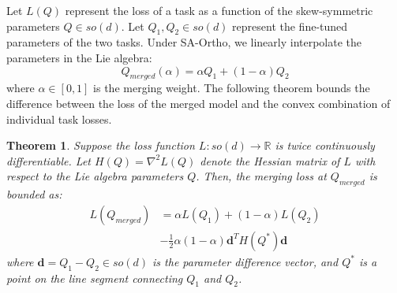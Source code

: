 \documentclass{article}
\theoremstyle{plain}
\newtheorem{theorem}{Theorem}[section]
\theoremstyle{definition}
\theoremstyle{remark}
\begin{document}
Let $L(Q)$ represent the loss of a task as a function of the skew-symmetric parameters $Q \in so(d)$. Let $Q_1, Q_2 \in so(d)$ represent the fine-tuned parameters of the two tasks. Under SA-Ortho, we linearly interpolate the parameters in the Lie algebra:
\begin{equation}
    Q_{merged}(\alpha) = \alpha Q_1 + (1-\alpha) Q_2
\end{equation}
where $\alpha \in [0, 1]$ is the merging weight. The following theorem bounds the difference between the loss of the merged model and the convex combination of individual task losses.

\begin{theorem}
\label{thm:interpolation_error}
Suppose the loss function $L: so(d) \rightarrow \mathbb{R}$ is twice continuously differentiable. Let $H(Q) = \nabla^2 L(Q)$ denote the Hessian matrix of $L$ with respect to the Lie algebra parameters $Q$. Then, the merging loss at $Q_{merged}$ is bounded as:
\begin{align}
    L(Q_{merged}) &= \alpha L(Q_1) + (1-\alpha) L(Q_2) \nonumber \\
    &- \frac{1}{2} \alpha(1-\alpha) \mathbf{d}^T H(Q^*) \mathbf{d}
\end{align}
where $\mathbf{d} = Q_1 - Q_2 \in so(d)$ is the parameter difference vector, and $Q^*$ is a point on the line segment connecting $Q_1$ and $Q_2$.
\end{theorem}
\end{document}

